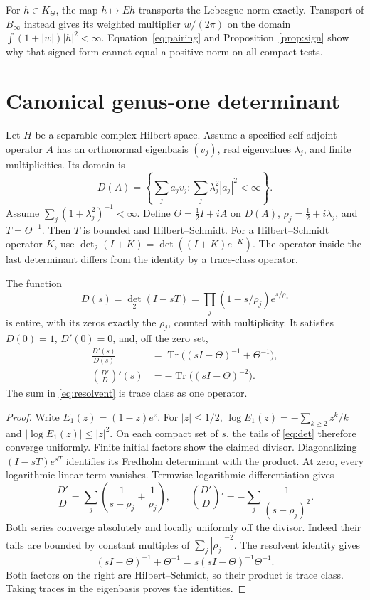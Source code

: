 \documentclass[11pt]{article}
\begin{document}
For $h\in K_\Theta$, the map $h\mapsto Eh$ transports the Lebesgue norm exactly.
Transport of $B_\infty$ instead gives its weighted multiplier $w/(2\pi)$ on the domain
$\int(1+|w|)|h|^2<\infty$.
Equation~\eqref{eq:pairing} and Proposition~\ref{prop:sign} show why that signed form cannot equal a positive norm on all compact tests.

\section{Canonical genus-one determinant}

Let $H$ be a separable complex Hilbert space.
Assume a specified self-adjoint operator $A$ has an orthonormal eigenbasis $(v_j)$,
real eigenvalues $\lambda_j$, and finite multiplicities.
Its domain is
\[
 D(A)=\left\{\sum_j a_jv_j:\sum_j\lambda_j^2|a_j|^2<\infty\right\}.
\]
Assume $\sum_j(1+\lambda_j^2)^{-1}<\infty$.
Define $\Theta=\tfrac12 I+iA$ on $D(A)$, $\rho_j=\tfrac12+i\lambda_j$, and
$T=\Theta^{-1}$.
Then $T$ is bounded and Hilbert--Schmidt.
For a Hilbert--Schmidt operator $K$, use
$\det_2(I+K)=\det((I+K)e^{-K})$.
The operator inside the last determinant differs from the identity by a trace-class operator.

\begin{theorem}\label{thm:det}
The function
\begin{equation}\label{eq:det}
 D(s)=\det_2(I-sT)=\prod_j(1-s/\rho_j)e^{s/\rho_j}
\end{equation}
is entire, with its zeros exactly the $\rho_j$, counted with multiplicity.
It satisfies $D(0)=1$, $D'(0)=0$, and, off the zero set,
\begin{align}
 \frac{D'(s)}{D(s)}
   &=\operatorname{Tr}\bigl((sI-\Theta)^{-1}+\Theta^{-1}\bigr),\label{eq:resolvent}\\
 \left(\frac{D'}D\right)'(s)
   &=-\operatorname{Tr}\bigl((sI-\Theta)^{-2}\bigr).\label{eq:second}
\end{align}
The sum in \eqref{eq:resolvent} is trace class as one operator.
\end{theorem}
\begin{proof}
Write $E_1(z)=(1-z)e^z$. For $|z|\le1/2$,
$\log E_1(z)=-\sum_{k\ge2}z^k/k$ and $|\log E_1(z)|\le|z|^2$.
On each compact set of $s$, the tails of \eqref{eq:det} therefore converge uniformly.
Finite initial factors show the claimed divisor.
Diagonalizing $(I-sT)e^{sT}$ identifies its Fredholm determinant with the product.
At zero, every logarithmic linear term vanishes.
Termwise logarithmic differentiation gives
\[
 \frac{D'}D=\sum_j\left(\frac1{s-\rho_j}+\frac1{\rho_j}\right),\qquad
 \left(\frac{D'}D\right)'=-\sum_j\frac1{(s-\rho_j)^2}.
\]
Both series converge absolutely and locally uniformly off the divisor.
Indeed their tails are bounded by constant multiples of $\sum_j|\rho_j|^{-2}$.
The resolvent identity gives
\[
 (sI-\Theta)^{-1}+\Theta^{-1}
      =s(sI-\Theta)^{-1}\Theta^{-1}.
\]
Both factors on the right are Hilbert--Schmidt, so their product is trace class.
Taking traces in the eigenbasis proves the identities.
\end{proof}
\end{document}
